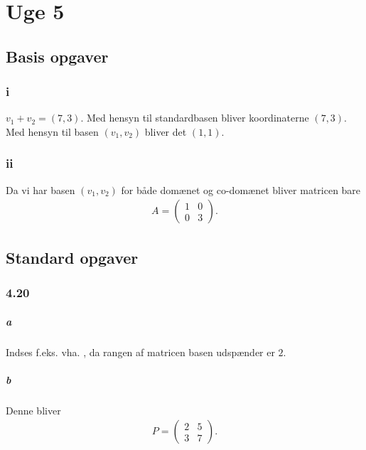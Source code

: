 
\chapter{Uge 5}

	\section{Basis opgaver}

		\subsection{i}

			$v_1+v_2=(7,3)$. Med hensyn til standardbasen bliver koordinaterne $(7,3)$. Med hensyn til basen $(v_1,v_2)$ bliver det $(1,1)$.

		\subsection{ii}

			Da vi har basen $(v_1,v_2)$ for både domænet og co-domænet bliver matricen bare
				\begin{align*}
					A=\left(\begin{array}{rr} {1} & {0} \\ {0} & {3} \end{array}\right).
				\end{align*}

	\section{Standard opgaver}

		\subsection{4.20}

			\paragraph{a} Indses f.eks. vha. \cite[Korollar 4.3.12]{hesselholt2017}, da rangen af matricen basen udspænder er $2$.

			\paragraph{b} Denne bliver 
				\begin{align*}
					P=\left(\begin{array}{rr} {2} & {5} \\ {3} & {7} \end{array}\right).
				\end{align*}

